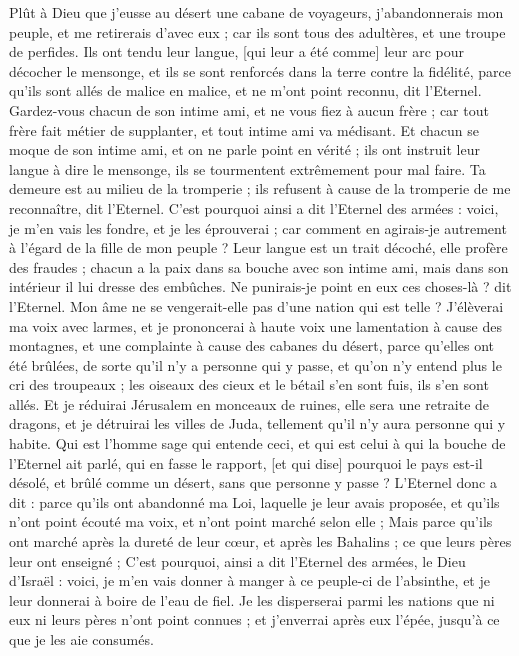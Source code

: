 \begin{multicols}{2}
Plût à Dieu que j'eusse au désert une cabane de voyageurs, j'abandonnerais mon peuple, et me retirerais d'avec eux ; car ils sont tous des adultères, et une troupe de perfides.
Ils ont tendu leur langue, [qui leur a été comme] leur arc pour décocher le mensonge, et ils se sont renforcés dans la terre contre la fidélité, parce qu'ils sont allés de malice en malice, et ne m'ont point reconnu, dit l'Eternel.
Gardez-vous chacun de son intime ami, et ne vous fiez à aucun frère ; car tout frère fait métier de supplanter, et tout intime ami va médisant.
Et chacun se moque de son intime ami, et on ne parle point en vérité ; ils ont instruit leur langue à dire le mensonge, ils se tourmentent extrêmement pour mal faire.
Ta demeure est au milieu de la tromperie ; ils refusent à cause de la tromperie de me reconnaître, dit l'Eternel.
C'est pourquoi ainsi a dit l'Eternel des armées : voici, je m'en vais les fondre, et je les éprouverai ; car comment en agirais-je autrement à l'égard de la fille de mon peuple ?
Leur langue est un trait décoché, elle profère des fraudes ; chacun a la paix dans sa bouche avec son intime ami, mais dans son intérieur il lui dresse des embûches.
Ne punirais-je point en eux ces choses-là ? dit l'Eternel. Mon âme ne se vengerait-elle pas d'une nation qui est telle ?
J'élèverai ma voix avec larmes, et je prononcerai à haute voix une lamentation à cause des montagnes, et une complainte à cause des cabanes du désert, parce qu'elles ont été brûlées, de sorte qu'il n'y a personne qui y passe, et qu'on n'y entend plus le cri des troupeaux ; les oiseaux des cieux et le bétail s'en sont fuis, ils s'en sont allés.
Et je réduirai Jérusalem en monceaux de ruines, elle sera une retraite de dragons, et je détruirai les villes de Juda, tellement qu'il n'y aura personne qui y habite.
Qui est l'homme sage qui entende ceci, et qui est celui à qui la bouche de l'Eternel ait parlé, qui en fasse le rapport, [et qui dise] pourquoi le pays est-il désolé, et brûlé comme un désert, sans que personne y passe ?
L'Eternel donc a dit : parce qu'ils ont abandonné ma Loi, laquelle je leur avais proposée, et qu'ils n'ont point écouté ma voix, et n'ont point marché selon elle ;
Mais parce qu'ils ont marché après la dureté de leur cœur, et après les Bahalins ; ce que leurs pères leur ont enseigné ;
C'est pourquoi, ainsi a dit l'Eternel des armées, le Dieu d'Israël : voici, je m'en vais donner à manger à ce peuple-ci de l'absinthe, et je leur donnerai à boire de l'eau de fiel.
Je les disperserai parmi les nations que ni eux ni leurs pères n'ont point connues ; et j'enverrai après eux l'épée, jusqu’à ce que je les aie consumés.

\end{multicols}
